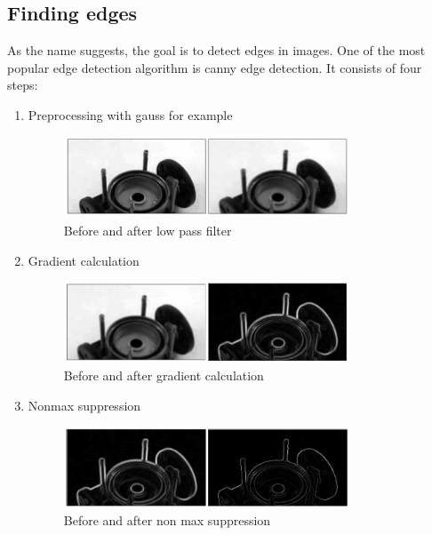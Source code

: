\documentclass[12pt]{article}
\begin{document}
\subsection{Finding edges}
As the name suggests, the goal is to detect edges in images.
One of the most popular edge detection algorithm is canny edge detection.
\newline
It consists of four steps:
\begin{enumerate}  
    \item Preprocessing with gauss for example
    \begin{figure}[!htb]
         \centering
         \includegraphics[width=0.8\textwidth]{pics/canny1}
         \caption{Before and after low pass filter}
         \label{fig:gaussfilter}
    \end{figure}

    \pagebreak
    \item Gradient calculation
    \begin{figure}[!htb]
        \centering
        \includegraphics[width=0.8\textwidth]{pics/canny2}
        \caption{Before and after gradient calculation}
        \label{fig:gradients}
    \end{figure}

    \item Nonmax suppression
    \begin{figure}[!htb]
        \centering
        \includegraphics[width=0.8\textwidth]{pics/canny3}
        \caption{Before and after non max suppression} 
        \label{fig:nonmaxsuppression} 
    \end{figure}


\end{enumerate}
\end{document}
